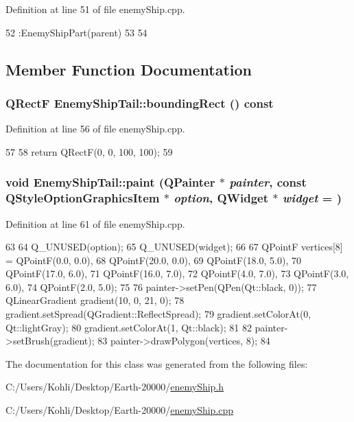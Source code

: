 Definition at line 51 of file enemyShip.cpp.


\begin{DoxyCode}
52         :EnemyShipPart(parent)
53 {
54 }
\end{DoxyCode}


\subsection{Member Function Documentation}
\hypertarget{class_enemy_ship_tail_a59a7ac770b95a29daec1133450c523d6}{
\subsubsection[{boundingRect}]{\setlength{\rightskip}{0pt plus 5cm}QRectF EnemyShipTail::boundingRect () const}}
\label{class_enemy_ship_tail_a59a7ac770b95a29daec1133450c523d6}


Definition at line 56 of file enemyShip.cpp.


\begin{DoxyCode}
57 {
58     return QRectF(0, 0, 100, 100);
59 }
\end{DoxyCode}
\hypertarget{class_enemy_ship_tail_a6898d654a2e6b5f8e144ad5a006aa027}{
\subsubsection[{paint}]{\setlength{\rightskip}{0pt plus 5cm}void EnemyShipTail::paint (QPainter $\ast$ {\em painter}, \/  const QStyleOptionGraphicsItem $\ast$ {\em option}, \/  QWidget $\ast$ {\em widget} = {})}}
\label{class_enemy_ship_tail_a6898d654a2e6b5f8e144ad5a006aa027}


Definition at line 61 of file enemyShip.cpp.


\begin{DoxyCode}
63 {
64     Q_UNUSED(option);
65     Q_UNUSED(widget);
66 
67     QPointF vertices[8] = {QPointF(0.0, 0.0),
68                                      QPointF(20.0, 0.0),
69                                      QPointF(18.0, 5.0),
70                                      QPointF(17.0, 6.0),
71                                      QPointF(16.0, 7.0),
72                                      QPointF(4.0, 7.0),
73                                      QPointF(3.0, 6.0),
74                                      QPointF(2.0, 5.0)};
75     
76     painter->setPen(QPen(Qt::black, 0));
77     QLinearGradient gradient(10, 0, 21, 0);
78     gradient.setSpread(QGradient::ReflectSpread);
79     gradient.setColorAt(0, Qt::lightGray);
80     gradient.setColorAt(1, Qt::black);
81     
82     painter->setBrush(gradient);
83     painter->drawPolygon(vertices, 8);
84 }
\end{DoxyCode}


The documentation for this class was generated from the following files:\begin{DoxyCompactItemize}
\item 
C:/Users/Kohli/Desktop/Earth-\/20000/\hyperlink{enemy_ship_8h}{enemyShip.h}\item 
C:/Users/Kohli/Desktop/Earth-\/20000/\hyperlink{enemy_ship_8cpp}{enemyShip.cpp}\end{DoxyCompactItemize}
